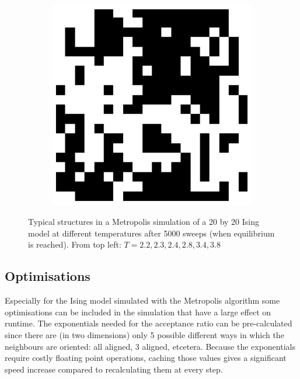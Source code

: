 \documentclass[11pt, a4paper]{report} %
\begin{document}
\begin{figure}[htb]
\begin{subfigure}[c]{0.2\linewidth}
	\end{subfigure}
	~
	\begin{subfigure}[c]{0.2\linewidth}
		\includegraphics[width=\linewidth]{20_by_20_Lattice_step5000_T=38.pdf}
	\end{subfigure}

	\caption{Typical structures in a Metropolis simulation of a 20 by 20 Ising model at different temperatures after 5000 sweeps (when equilibrium is reached). From top left: \(T=2.2,2.3,2.4,2.8,3.4,3.8\)}
	\label{fig:metropolis_ising_at_temps}
\end{figure}

\subsection{Optimisations}
Especially for the Ising model simulated with the Metropolis algorithm some optimisations can be included in the simulation that have a large effect on runtime.
The exponentials needed for the acceptance ratio can be pre-calculated since there are (in two dimensions) only 5 possible different ways in which the neighbours are oriented:
all aligned, 3 aligned, etcetera.
Because the exponentials require costly floating point operations, caching those values gives a significant speed increase compared to recalculating them at every step.
\end{document}
